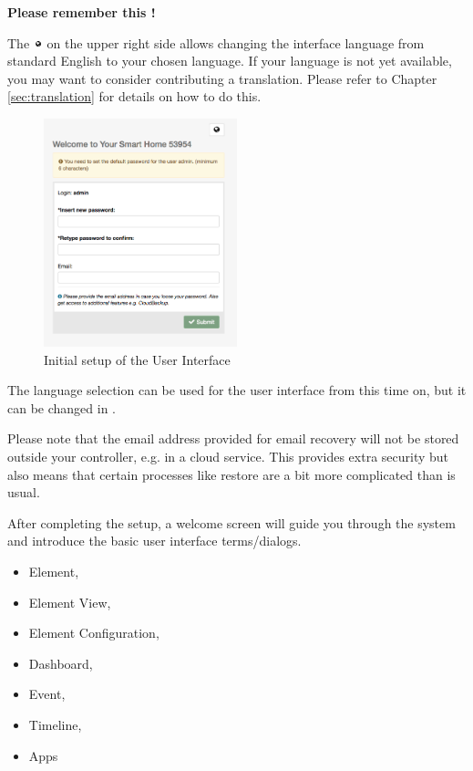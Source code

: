 \textbf{Please remember this \zwaydeviceid!}

The  \includegraphics[width=0.02\textwidth]{pngs/world.png} on the upper right side 
allows changing the interface language from 
standard English to your chosen language. If your language is not yet available, you 
may want to consider contributing a translation. Please refer to Chapter \ref{sec:translation} 
for details on how to do this.

\begin{figure}
\begin{center}
\includegraphics[width=0.5\textwidth]{pngs/cap3/init1.png}
\caption{Initial setup of the \zway User Interface}
\label{init1}
\end{center}
\end{figure}

The language selection can be used for the user interface from this time on, but it can 
be changed in .

Please note that the email address provided for email recovery will not be stored outside 
your controller, e.g. in a cloud service. This provides extra security but also means that 
certain processes like restore are a bit more complicated than is usual.

After completing the setup, a welcome screen will guide you through the system and 
introduce the basic user interface terms/dialogs.

\begin{itemize}
\item Element,
\item Element View,
\item Element Configuration,
\item Dashboard,
\item Event,
\item Timeline,
\item Apps
\end{itemize}

